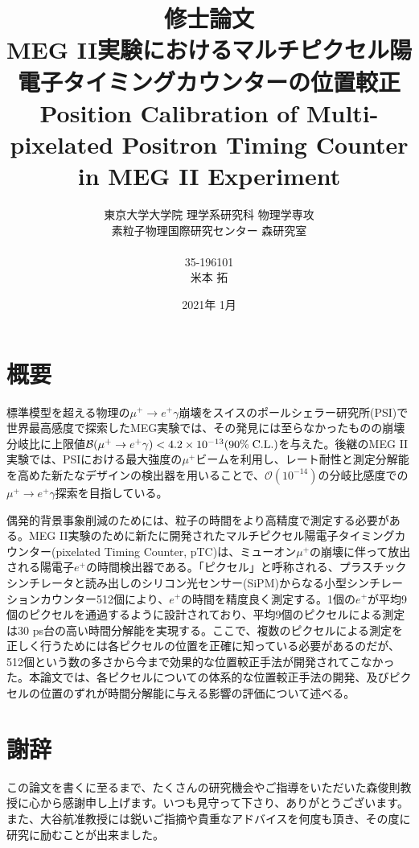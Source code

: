 \documentclass[report]{jsbook}
\title{
修士論文\\[1.8cm]
{\bf MEG II実験におけるマルチピクセル陽電子タイミングカウンターの位置較正} \\
{\LARGE Position Calibration of Multi-pixelated Positron Timing Counter in MEG II Experiment}
\\[0.8cm]}
\author{東京大学大学院 理学系研究科 物理学専攻\\
素粒子物理国際研究センター 森研究室\\ \\
35-196101\\[2.5mm]
\LARGE 米本 拓}
\date{2021年 1月}
\begin{document}

\maketitle
\chapter*{概要}

標準模型を超える物理の$\mu^+ \to e^+\gamma$崩壊をスイスのポールシェラー研究所(PSI)で世界最高感度で探索したMEG実験では、その発見には至らなかったものの崩壊分岐比に上限値$\mathcal{B} (\mu^+ \to e^+\gamma) < 4.2 \times 10^{-13} (90\% \; {\rm C.L.})$を与えた。後継のMEG II実験では、PSIにおける最大強度の$\mu^+$ビームを利用し、レート耐性と測定分解能を高めた新たなデザインの検出器を用いることで、$\mathcal{O}(10^{-14})$の分岐比感度での$\mu^+ \to e^+\gamma$探索を目指している。 

偶発的背景事象削減のためには、粒子の時間をより高精度で測定する必要がある。MEG II実験のために新たに開発されたマルチピクセル陽電子タイミングカウンター(pixelated Timing Counter, pTC)は、ミューオン$\mu^+$の崩壊に伴って放出される陽電子$e^+$の時間検出器である。「ピクセル」と呼称される、プラスチックシンチレータと読み出しのシリコン光センサー(SiPM)からなる小型シンチレーションカウンター512個により、$e^+$の時間を精度良く測定する。1個の$e^+$が平均9個のピクセルを通過するように設計されており、平均9個のピクセルによる測定は$ 30 $ ps台の高い時間分解能を実現する。ここで、複数のピクセルによる測定を正しく行うためには各ピクセルの位置を正確に知っている必要があるのだが、512個という数の多さから今まで効果的な位置較正手法が開発されてこなかった。本論文では、各ピクセルについての体系的な位置較正手法の開発、及びピクセルの位置のずれが時間分解能に与える影響の評価について述べる。 \\

\setcounter{tocdepth}{2}
\tableofcontents








\chapter*{謝辞}
この論文を書くに至るまで、たくさんの研究機会やご指導をいただいた森俊則教授に心から感謝申し上げます。いつも見守って下さり、ありがとうございます。
また、大谷航准教授には鋭いご指摘や貴重なアドバイスを何度も頂き、その度に研究に励むことが出来ました。
\end{document}
